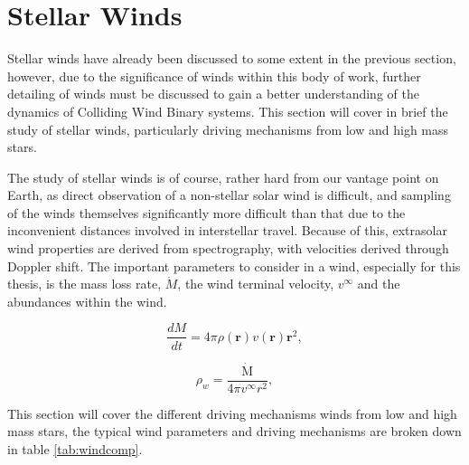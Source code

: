 \section{Stellar Winds}
\label{sec:winds}


Stellar winds have already been discussed to some extent in the previous section, however, due to the significance of winds within this body of work, further detailing of winds must be discussed to gain a better understanding of the dynamics of Colliding Wind Binary systems. This section will cover in brief the study of stellar winds, particularly driving mechanisms from low and high mass stars.




The study of stellar winds is of course, rather hard from our vantage point on Earth, as direct observation of a non-stellar solar wind is difficult, and sampling of the winds themselves significantly more difficult than that due to the inconvenient distances involved in interstellar travel.
Because of this, extrasolar wind properties are derived from spectrography, with velocities derived through Doppler shift.
The important parameters to consider in a wind, especially for this thesis, is the mass loss rate, $\dot M$, the wind terminal velocity, $v^\infty$ and the abundances within the wind.


\begin{equation}
  \frac{dM}{dt} = 4 \pi \rho(\boldsymbol{r}) v(\boldsymbol{r}) \boldsymbol{r}^2, \label{eq:massloss}
\end{equation}

\begin{equation}
  \rho_w = \frac{\dot{\text{M}}}{4 \pi v^\infty r^2}, \label{eq:smoothwind}
\end{equation}

This section will cover the different driving mechanisms winds from low and high mass stars, the typical wind parameters and driving mechanisms are broken down in table \ref{tab:windcomp}.


